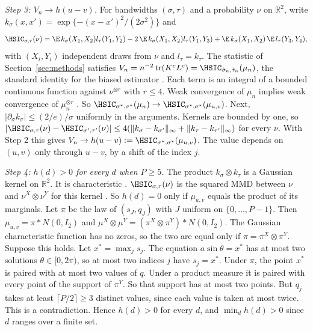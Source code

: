 \emph{Step 3: $V_n\to h(u-v)$.} For bandwidths $(\sigma,\tau)$ and a probability $\nu$ on $\mathbb R^2$, write $k_\sigma(x,x')=\exp\{-(x-x')^2/(2\sigma^2)\}$ and
\[
\HSIC_{\sigma,\tau}(\nu)=\E\,k_\sigma(X_1,X_2)l_\tau(Y_1,Y_2)-2\,\E\,k_\sigma(X_1,X_2)l_\tau(Y_1,Y_3)+\E\,k_\sigma(X_1,X_2)\,\E\,l_\tau(Y_3,Y_4),
\]
with $(X_i,Y_i)$ independent draws from $\nu$ and $l_\tau=k_\tau$. The statistic of Section~\ref{sec:methods} satisfies $V_n=n^{-2}\operatorname{tr}(K^cL^c)=\HSIC_{\hat\sigma_n,\hat\tau_n}(\mu_n)$, the standard identity for the biased estimator \citep{gretton2005measuring}\vc. Each term is an integral of a bounded continuous function against $\nu^{\otimes r}$ with $r\le4$. Weak convergence of $\mu_n$ implies weak convergence of $\mu_n^{\otimes r}$ \citep[Theorem~2.8]{billingsley1999convergence}\vc. So $\HSIC_{\sigma^*,\sigma^*}(\mu_n)\to\HSIC_{\sigma^*,\sigma^*}(\mu_{u,v})$. Next, $|\partial_\sigma k_\sigma|\le(2/e)/\sigma$ uniformly in the arguments. Kernels are bounded by one, so $|\HSIC_{\sigma,\tau}(\nu)-\HSIC_{\sigma',\tau'}(\nu)|\le4(\|k_\sigma-k_{\sigma'}\|_\infty+\|k_\tau-k_{\tau'}\|_\infty)$ for every $\nu$. With Step 2 this gives $V_n\to h(u-v):=\HSIC_{\sigma^*,\sigma^*}(\mu_{u,v})$. The value depends on $(u,v)$ only through $u-v$, by a shift of the index $j$.

\emph{Step 4: $h(d)>0$ for every $d$ when $P\ge5$.} The product $k_\sigma\otimes k_\tau$ is a Gaussian kernel on $\mathbb R^2$. It is characteristic \citep{sriperumbudur2010hilbert}\vc. $\HSIC_{\sigma,\tau}(\nu)$ is the squared MMD between $\nu$ and $\nu^X\otimes\nu^Y$ for this kernel \citep{gretton2005measuring}\vc. So $h(d)=0$ only if $\mu_{u,v}$ equals the product of its marginals. Let $\pi$ be the law of $(s_J,q_J)$ with $J$ uniform on $\{0,\ldots,P-1\}$. Then $\mu_{u,v}=\pi*N(0,I_2)$ and $\mu^X\otimes\mu^Y=(\pi^X\otimes\pi^Y)*N(0,I_2)$. The Gaussian characteristic function has no zeros, so the two are equal only if $\pi=\pi^X\otimes\pi^Y$. Suppose this holds. Let $x^*=\max_js_j$. The equation $a\sin\theta=x^*$ has at most two solutions $\theta\in[0,2\pi)$, so at most two indices $j$ have $s_j=x^*$. Under $\pi$, the point $x^*$ is paired with at most two values of $q$. Under a product measure it is paired with every point of the support of $\pi^Y$. So that support has at most two points. But $q_j$ takes at least $\lceil P/2\rceil\ge3$ distinct values, since each value is taken at most twice. This is a contradiction. Hence $h(d)>0$ for every $d$, and $\min_dh(d)>0$ since $d$ ranges over a finite set.

